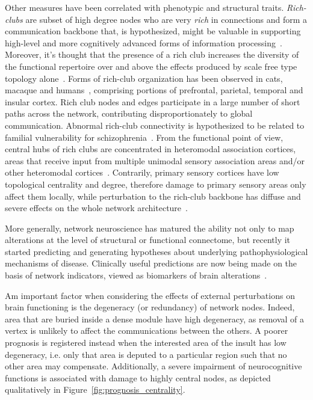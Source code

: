Other measures have been correlated with phenotypic and structural traits.
\emph{Rich-clubs} are subset of high degree nodes who are very \emph{rich} in connections and form a communication backbone that, is hypothesized, might be valuable in supporting high-level and more cognitively advanced forms of information processing~\cite{collin2014}. Moreover, it's thought that the presence of a rich club increases the diversity of the functional repertoire over and above the effects produced by scale free type topology alone~\cite{senden2014}.
Forms of rich-club organization has been observed in cats, macaque and humans~\cite{vandenheuvel2011,harriger2012,dereus2013a,collin2014}, comprising portions of prefrontal, parietal, temporal and insular cortex. Rich club nodes and edges participate in a large number of short paths across the network, contributing disproportionately to global communication. 
Abnormal rich-club connectivity is hypothesized to be related  to familial vulnerability for schizophrenia~\cite{collin2014impaired}.
From the functional point of view, central hubs of rich clubs are concentrated in heteromodal association cortices, areas that receive input from multiple unimodal sensory association areas and/or other heteromodal cortices~\cite{kandel2013}. Contrarily, primary sensory cortices have low topological centrality and degree, therefore damage to primary sensory areas only affect them locally, while perturbation to the rich-club backbone has diffuse and severe effects on the whole network architecture~\cite{honey2008}.

More generally, network neuroscience has matured the ability not only to map alterations at the level of structural or functional connectome, but recently it started predicting and generating hypotheses about underlying pathophysiological mechanisms of disease. Clinically useful predictions are now being made on the basis of network indicators, viewed as biomarkers of brain alterations~\cite{fornito2015}.

Am important factor when considering the effects of external perturbations on brain functioning is the degeneracy (or redundancy) of network nodes. Indeed, area that are buried inside a dense module have high degeneracy, as removal of a vertex is unlikely to affect the communications between the others. A poorer prognosis is registered instead when the interested area of the insult has low degeneracy, i.e. only that area is deputed to a particular region such that no other area may compensate.
Additionally, a severe impairment of neurocognitive functions is associated with damage to highly central nodes, as depicted qualitatively in Figure~\ref{fig:prognosis_centrality}.

